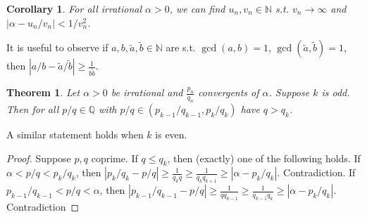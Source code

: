 \documentclass{article}
\theoremstyle{definition}
\theoremstyle{remark}
\theoremstyle{plain}
\newtheorem{thm}[defn]{Theorem}
\newtheorem{crly}[defn]{Corollary}
\newcommand{\NN}{\mathbb{N}}
\newcommand{\QQ}{\mathbb{Q}}
\begin{document}
\begin{crly}
    For all irrational $\alpha>0$, we can find $u_n,v_n\in\NN$ s.t. $v_n\to \infty$ and $|\alpha-u_n/v_n|<1/v_n^2$.
\end{crly}
It is useful to observe if $a,b,\tilde a,\tilde b\in\NN$ are s.t. $\gcd(a,b)=1$, $\gcd(\tilde a,\tilde b)=1$, then $|a/b-\tilde a/\tilde b|\ge \frac{1}{b\tilde b}$.
\begin{thm}
    Let $\alpha>0$ be irrational and $\frac{p_n}{q_n}$ convergents of $\alpha$. Suppose $k$ is odd. Then for all $p/q\in\QQ$ with $p/q\in(p_{k-1}/q_{k-1},p_k/q_k)$ have $q>q_k$.
\end{thm}
A similar statement holds when $k$ is even.
\begin{proof}
    Suppose $p,q$ coprime. If $q\le q_k$, then (exactly) one of the following holds.
    If $\alpha<p/q<p_k/q_k$, then $|p_k/q_k-p/q|\ge \frac{1}{q_kq}\ge\frac{1}{q_kq_{k+1}}\ge |\alpha-p_k/q_k|$. Contradiction.
    If $p_{k-1}/q_{k-1}<p/q<\alpha$, then $|p_{k-1}/q_{k-1}-p/q|\ge\frac{1}{qq_{k-1}}\ge\frac{1}{q_{k-1}q_k}\ge |\alpha-p_k/q_k|$. Contradiction
\end{proof}
\end{document}

